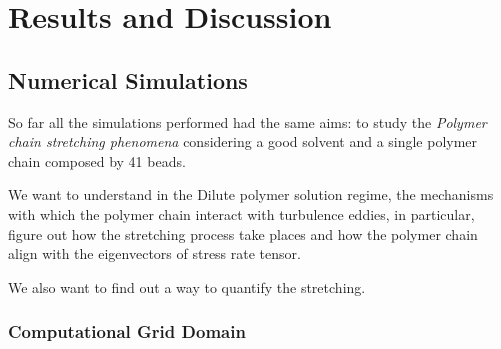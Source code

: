 \chapter{Results and Discussion}\label{chap_results}


\section{Numerical Simulations}





So far all the simulations performed had the same aims: to study the \textit{Polymer chain stretching phenomena}
considering a good solvent and a single polymer chain composed by 41 beads.

We want to understand in the Dilute polymer solution regime,
the mechanisms with which the polymer chain interact with turbulence eddies, in particular, figure out how the stretching process take places and how the polymer chain align with the eigenvectors of stress rate tensor.

We also want to find out a way to quantify the stretching. 

\subsection{Computational Grid Domain}

